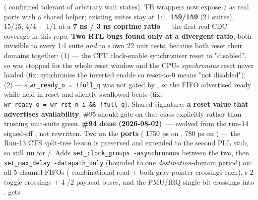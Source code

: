 \begin{record}
\begin{enumerate}
  ( confirmed tolerant of arbitrary  wait
  states). TB wrappers now expose / as
  real ports with a shared  helper; existing suites
  stay at 1:1.  \textbf{159/159} (21 suites),
   15/15,  4/4 +
   1/1 at a \textbf{7 ns / 3 ns coprime ratio}
  --- the first real CDC coverage in this repo. \warn{} \textbf{Two RTL
  bugs found only at a divergent ratio}, both invisible to every 1:1
  suite \emph{and} to \textquotesingle s own 22
  unit tests, because both reset their domains together: (1)
   --- the CPU clock-enable synchroniser reset to
  "disabled", so  was stopped for the whole reset
  window and the CPU\textquotesingle s \emph{synchronous} reset never
  loaded  (fix: synchronise the inverted enable so
  reset-to-0 means "not disabled"); (2)  ---
  \textquotesingle s
  \texttt{wr\_\allowbreak{}ready\_\allowbreak{}o\ =\allowbreak{}\ !full\_\allowbreak{}q}
  was not gated by , so the FIFO advertised ready while
  held in reset and silently swallowed beats (fix:
  \texttt{wr\_\allowbreak{}ready\_\allowbreak{}o\ =\allowbreak{}\ wr\_\allowbreak{}rst\_\allowbreak{}n\_\allowbreak{}i\ \&\&\ !full\_\allowbreak{}q}).
  Shared signature: \textbf{a reset value that advertises availability}.
  \#95 should gate on that class explicitly rather than trusting
  unit-suite green. \textbf{\#94 done (2026-08-02)}:
   --- evolved from the
  run-14 signed-off , not rewritten. Two
   on the \textbf{ports} ( 1750 ps on
  ,  780 ps on ) --- the
  Run-13 CTS split-tree lesson is preserved and extended to the second
  PLL stub, so still \textbf{no } for
  /. Adds
  \texttt{set\_\allowbreak{}clock\_\allowbreak{}groups\ -\allowbreak{}asynchronous}
  between the two, then
  \texttt{set\_\allowbreak{}max\_\allowbreak{}delay\ -\allowbreak{}datapath\_\allowbreak{}only}
  (bounded to one \emph{destination}-domain period) on: all 5
   channel FIFOs ( combinational read +
  both gray-pointer crossings each),
  \textquotesingle s 2 toggle crossings + 4
  /2  payload buses, and the PMU/IRQ single-bit
  crossings into .  gets

\end{enumerate}
\end{record}
